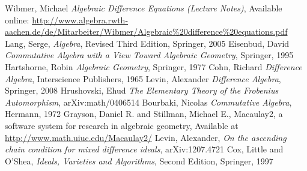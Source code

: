 \begin{thebibliography}{9}
 Wibmer, Michael \emph{Algebraic Difference Equations (Lecture Notes)}, Available online: \url{http://www.algebra.rwth-aachen.de/de/Mitarbeiter/Wibmer/Algebraic\%20difference\%20equations.pdf}
 Lang, Serge, \emph{Algebra}, Revised Third Edition, Springer, 2005
 Eisenbud, David \emph{Commutative Algebra with a View Toward Algebraic Geometry}, Springer, 1995
 Hartshorne, Robin \emph{Algebraic Geometry}, Springer, 1977
 Cohn,  Richard \emph{Difference Algebra}, Interscience Publishers, 1965
 Levin, Alexander \emph{Difference Algebra}, Springer, 2008
 Hrushovski, Ehud \emph{The Elementary Theory of the Frobenius Automorphism}, arXiv:math/0406514 
 Bourbaki, Nicolas \emph{Commutative Algebra}, Hermann, 1972
 Grayson, Daniel R. and Stillman, Michael E., Macaulay2, a software system for research in algebraic geometry, Available at \href{http://www.math.uiuc.edu/Macaulay2/}{http://www.math.uiuc.edu/Macaulay2/}
 Levin, Alexander, \emph{On the ascending chain condition for mixed difference ideals}, 	arXiv:1207.4721
 Cox, Little and O'Shea, \emph{ Ideals, Varieties and Algorithms}, Second Edition, Springer, 1997
\end{thebibliography}
